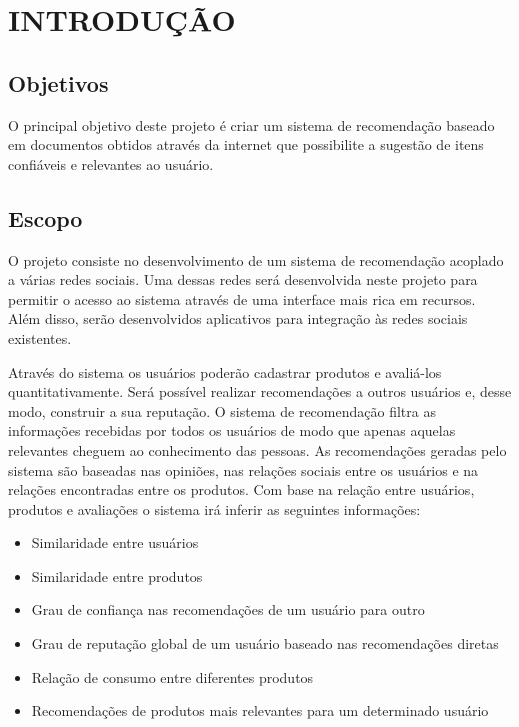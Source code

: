 \chapter{INTRODUÇÃO} 

\section{Objetivos} %

 O principal objetivo deste projeto é criar um sistema de recomendação baseado em documentos obtidos através da internet que possibilite a sugestão de itens confiáveis e relevantes ao usuário.

\section{Escopo}

 O projeto consiste no desenvolvimento de um sistema de recomendação acoplado a várias redes sociais. Uma dessas redes será desenvolvida neste projeto para permitir o acesso ao sistema através de uma interface mais rica em recursos. Além disso, serão desenvolvidos aplicativos para integração às redes sociais existentes.

 Através do sistema os usuários poderão cadastrar produtos e avaliá-los quantitativamente. Será possível realizar recomendações a outros usuários e, desse modo, construir a sua reputação. O sistema de recomendação filtra as informações recebidas por todos os usuários de modo que apenas aquelas relevantes cheguem ao conhecimento das pessoas. As recomendações geradas pelo sistema são baseadas nas opiniões, nas relações sociais entre os usuários e na relações encontradas entre os produtos. Com base na relação entre usuários, produtos e avaliações o sistema irá inferir as seguintes informações:
\begin{itemize}

 \item Similaridade entre usuários

 \item Similaridade entre produtos

 \item Grau de confiança nas recomendações de um usuário para outro

 \item Grau de reputação global de um usuário baseado nas recomendações diretas

 \item Relação de consumo entre diferentes produtos

 \item Recomendações de produtos mais relevantes para um determinado usuário

\end{itemize}

